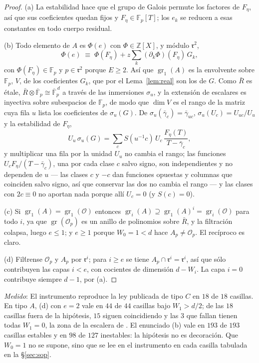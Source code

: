 \documentclass[11pt,a4paper]{article}
\theoremstyle{definition}
\newcommand{\ZZ}{\mathbb{Z}}
\newcommand{\FF}{\mathbb{F}}
\newcommand{\cO}{\mathcal{O}}
\newcommand{\rad}{\mathfrak{r}}
\newcommand{\gr}{\operatorname{gr}}
\newcommand{\medido}[1]{\emph{Medido}: #1}
\begin{document}
\begin{proof}
(a) La estabilidad hace que el grupo de Galois permute los factores de $F_\eta$, as\'i que sus
coeficientes quedan fijos y $F_\eta\in\FF_p[T]$; los $e_k$ se reducen a esas constantes en todo
cuerpo residual.

(b) Todo elemento de $A$ es $\Phi(e)$ con $\Phi\in\ZZ[X]$, y m\'odulo $\rad^2$,
\[
\Phi(e)\;\equiv\;\Phi(F_\eta)+z\sum_k(\partial_k\Phi)(F_\eta)\,G_k ,
\]
con $\Phi(F_\eta)\in\FF_p$ y $p\in\rad^2$ porque $E\ge2$. As\'i que $\gr_1(A)$ es la envolvente
sobre $\FF_p$, $V$, de los coeficientes $G_k$, que por el Lema~\ref{lem:real} son los de $G$. Como
$\bar R$ es \'etale, $\bar R\otimes\overline{\FF}_p\cong\overline{\FF}_p^{\,d}$ a trav\'es de las
inmersiones $\sigma_u$, y la extensi\'on de escalares es inyectiva sobre subespacios de $\FF_p$, de
modo que $\dim V$ es el rango de la matriz cuya fila $u$ lista los coeficientes de $\sigma_u(G)$. De
$\sigma_u(\bar\gamma_c)=\bar\gamma_{uc}$, $\sigma_u(U_c)=U_{uc}/U_u$ y la estabilidad de $F_\eta$,
\[
U_u\,\sigma_u(G)=\sum_c S(u^{-1}c)\,U_c\,\frac{F_\eta(T)}{T-\bar\gamma_c},
\]
y multiplicar una fila por la unidad $U_u$ no cambia el rango; las funciones
$U_cF_\eta/(T-\bar\gamma_c)$, una por cada clase $c$ salvo signo, son independientes y no
dependen de $u$ --- las clases $c$ y $-c$ dan funciones opuestas y columnas que coinciden salvo
signo, as\'i que conservar las dos no cambia el rango --- y las clases con $2c\equiv0$ no aportan
nada porque all\'i $U_c=0$ (y $S(c)=0$).

(c) Si $\gr_1(A)=\gr_1(\cO)$ entonces $\gr_i(A)\supseteq\gr_1(A)^i=\gr_i(\cO)$ para todo $i$, ya que
$\gr(\cO_p)$ es un anillo de polinomios sobre $\bar R$, y la filtraci\'on colapsa, luego $e\le1$; y
$e\ge1$ porque $W_0=1<d$ hace $A_p\ne\cO_p$. El rec\'iproco es claro.

(d) Fil\'trense $\cO_p$ y $A_p$ por $\rad^i$; para $i\ge e$ se tiene $A_p\cap\rad^i=\rad^i$, as\'i
que s\'olo contribuyen las capas $i<e$, con cocientes de dimensi\'on $d-W_i$. La capa $i=0$
contribuye siempre $d-1$, por (a).
\end{proof}

\medido{El instrumento reproduce la ley publicada de tipo $C$ en $18$ de $18$ casillas. En tipo $A$,
(d) con $e=2$ vale en $44$ de $44$ casillas bajo $W_1>d/2$; de las $18$ casillas fuera de la
hip\'otesis, $15$ siguen coincidiendo y las $3$ que fallan tienen todas $W_1=0$, la zona de la
escalera de \cite{Cond}. El
enunciado (b) vale en $193$ de $193$ casillas estables y en $98$ de $127$ inestables: la
hip\'otesis no es decoraci\'on. Que $W_0=1$ no se supone, sino que se lee en el instrumento en cada
casilla tabulada en la \S\ref{sec:sop}.}
\end{document}
